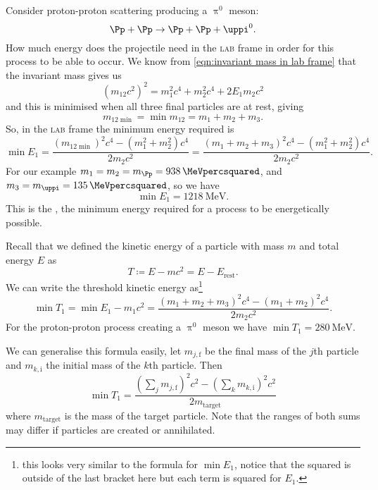 \documentclass[fleqn]{NotesClass}
\makeatletter
\newcommand{\PBASE@pion}{\ensuremath{\uppi}}
\newcommand{\PBASE@pion}{\ensuremath{\pi}}
\newcommand{\Ppion}{\PBASE@pion}
\newcommand{\Ppionzero}{\ensuremath{\Ppion^0}}
\newcommand{\Ppi}{\Ppion}
\newcommand{\Ppizero}{\Ppionzero}
\newcommand{\LAB}{\textsc{lab}}
\makeatother
\begin{document}
    Consider proton-proton scattering producing a \Ppizero{} meson:
    \begin{equation}
        \Pp + \Pp \to \Pp + \Pp + \Ppizero.
    \end{equation}
    How much energy does the projectile need in the \LAB{} frame in order for this process to be able to occur.
    We know from \cref{eqn:invariant mass in lab frame} that the invariant mass gives us
    \begin{equation}
        (m_{12}c^2)^2 = m_1^2c^4 + m_2^2c^4 + 2E_1m_2c^2
    \end{equation}
    and this is minimised when all three final particles are at rest, giving
    \begin{equation}
        m_{12\min} = \min m_{12} = m_1 + m_2 + m_3.
    \end{equation}
    So, in the \LAB{} frame the minimum energy required is
    \begin{equation}
        \min E_1 = \frac{(m_{12\min})^2 c^4 - (m_1^2 + m_2^2)c^4}{2m_2c^2} = \frac{(m_1 + m_2 + m_3)^2c^4 - (m_1^2 + m_2^2)c^4}{2m_2c^2}.
    \end{equation}
    For our example \(m_1 = m_2 = m_{\Pp} = \qty{938}{\MeVpercsquared}\), and \(m_3 = m_{\Ppi} = \qty{135}{\MeVpercsquared}\), so we have
    \begin{equation}
        \min E_1 = \qty{1218}{\MeV}.
    \end{equation}
    This is the , the minimum energy required for a process to be energetically possible.
    
    Recall that we defined the kinetic energy of a particle with mass \(m\) and total energy \(E\) as
    \begin{equation}
        T \coloneqq E - mc^2 = E - E_{\mathrm{rest}}.
    \end{equation}
    We can write the threshold kinetic energy as\footnote{this looks very similar to the formula for \(\min E_1\), notice that the squared is outside of the last bracket here but each term is squared for \(E_1\).}
    \begin{equation}
        \min T_1 = \min E_1 - m_1c^2 = \frac{(m_1 + m_2 + m_3)^2c^4 - (m_1 + m_2)^2c^4}{2m_2c^2}.
    \end{equation}
    For the proton-proton process creating a \Ppizero{} meson we have \(\min T_1 = \qty{280}{\MeV}\).
    
    We can generalise this formula easily, let \(m_{j,\mathrm{f}}\) be the final mass of the \(j\)th particle and \(m_{k, \mathrm{i}}\) the initial mass of the \(k\)th particle.
    Then
    \begin{equation}
        \min T_1 = \frac{(\sum_j m_{j,\mathrm{f}})^2c^2 - (\sum_k m_{k,\mathrm{i}})^2c^2}{2m_{\mathrm{target}}}
    \end{equation}
    where \(m_{\mathrm{target}}\) is the mass of the target particle.
    Note that the ranges of both sums may differ if particles are created or annihilated.
    
\end{document}
